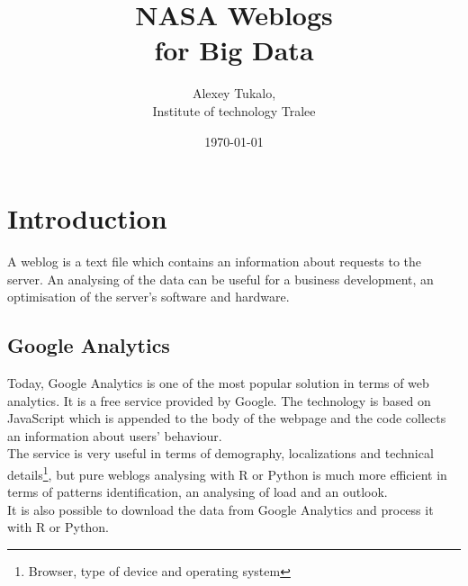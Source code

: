 \documentclass[english]{article}
\date{}
\begin{document}
\title{\vspace{3in}NASA Weblogs\\
\small for Big Data\\
\vspace{0.7in}}

\nopagebreak
\maketitle


\vspace{3in}

\author{
\begin{flushright}
Alexey Tukalo,\\
Institute of technology Tralee
\end{flushright}
}

\date{\today}
\thispagestyle{empty}

\newpage
\setcounter{page}{1}
\setcounter{tocdepth}{2}
\tableofcontents

\newpage


\section{Introduction}
A weblog is a text file which contains an information about requests to the server. An analysing of the data can be useful for a business development, an optimisation of the server's software and hardware.


\subsection{Google Analytics}
Today, Google Analytics is one of the most popular solution in terms of web analytics. It is a free service provided by Google. The technology is based on JavaScript which is appended to the body of the webpage and the code collects an information about users' behaviour. \\
The service is very useful in terms of demography, localizations and technical details\footnote{Browser, type of device and operating system}, but pure weblogs analysing with R or Python is much more efficient in terms of patterns identification, an analysing of load and an outlook.\\
It is also possible to download the data from Google Analytics and process it with R or Python.
\end{document}
